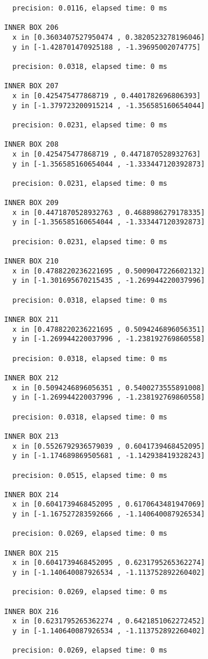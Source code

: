 \begin{verbatim}
  precision: 0.0116, elapsed time: 0 ms

INNER BOX 206
  x in [0.3603407527950474 , 0.3820523278196046]
  y in [-1.428701470925188 , -1.39695002074775]

  precision: 0.0318, elapsed time: 0 ms

INNER BOX 207
  x in [0.425475477868719 , 0.4401782696806393]
  y in [-1.379723200915214 , -1.356585160654044]

  precision: 0.0231, elapsed time: 0 ms

INNER BOX 208
  x in [0.425475477868719 , 0.4471870528932763]
  y in [-1.356585160654044 , -1.333447120392873]

  precision: 0.0231, elapsed time: 0 ms

INNER BOX 209
  x in [0.4471870528932763 , 0.4688986279178335]
  y in [-1.356585160654044 , -1.333447120392873]

  precision: 0.0231, elapsed time: 0 ms

INNER BOX 210
  x in [0.4788220236221695 , 0.5009047226602132]
  y in [-1.301695670215435 , -1.269944220037996]

  precision: 0.0318, elapsed time: 0 ms

INNER BOX 211
  x in [0.4788220236221695 , 0.5094246896056351]
  y in [-1.269944220037996 , -1.238192769860558]

  precision: 0.0318, elapsed time: 0 ms

INNER BOX 212
  x in [0.5094246896056351 , 0.5400273555891008]
  y in [-1.269944220037996 , -1.238192769860558]

  precision: 0.0318, elapsed time: 0 ms

INNER BOX 213
  x in [0.5526792936579039 , 0.6041739468452095]
  y in [-1.174689869505681 , -1.142938419328243]

  precision: 0.0515, elapsed time: 0 ms

INNER BOX 214
  x in [0.6041739468452095 , 0.6170643481947069]
  y in [-1.167527283592666 , -1.140640087926534]

  precision: 0.0269, elapsed time: 0 ms

INNER BOX 215
  x in [0.6041739468452095 , 0.6231795265362274]
  y in [-1.140640087926534 , -1.113752892260402]

  precision: 0.0269, elapsed time: 0 ms

INNER BOX 216
  x in [0.6231795265362274 , 0.6421851062272452]
  y in [-1.140640087926534 , -1.113752892260402]

  precision: 0.0269, elapsed time: 0 ms


\end{verbatim}
